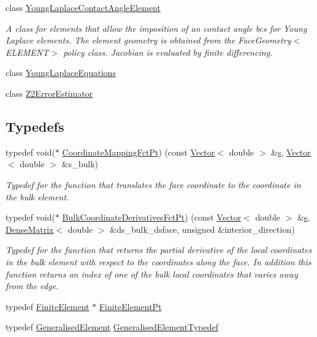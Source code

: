 \begin{DoxyCompactItemize}
class \hyperlink{classoomph_1_1YoungLaplaceContactAngleElement}{Young\+Laplace\+Contact\+Angle\+Element}
\begin{DoxyCompactList}\small\item\em A class for elements that allow the imposition of an contact angle bcs for Young Laplace elements. The element geometry is obtained from the Face\+Geometry$<$\+E\+L\+E\+M\+E\+N\+T$>$ policy class. Jacobian is evaluated by finite differencing. \end{DoxyCompactList}\item 
class \hyperlink{classoomph_1_1YoungLaplaceEquations}{Young\+Laplace\+Equations}
\item 
class \hyperlink{classoomph_1_1Z2ErrorEstimator}{Z2\+Error\+Estimator}
\end{DoxyCompactItemize}
\subsection*{Typedefs}
\begin{DoxyCompactItemize}
\item 
typedef void($\ast$ \hyperlink{namespaceoomph_afa5c7a93cae1917e874b392601be0bde}{Coordinate\+Mapping\+Fct\+Pt}) (const \hyperlink{classoomph_1_1Vector}{Vector}$<$ double $>$ \&\hyperlink{cfortran_8h_ab7123126e4885ef647dd9c6e3807a21c}{s}, \hyperlink{classoomph_1_1Vector}{Vector}$<$ double $>$ \&s\+\_\+bulk)
\begin{DoxyCompactList}\small\item\em Typedef for the function that translates the face coordinate to the coordinate in the bulk element. \end{DoxyCompactList}\item 
typedef void($\ast$ \hyperlink{namespaceoomph_a0a75fbfa1139f00cf88adeee835c8fe5}{Bulk\+Coordinate\+Derivatives\+Fct\+Pt}) (const \hyperlink{classoomph_1_1Vector}{Vector}$<$ double $>$ \&\hyperlink{cfortran_8h_ab7123126e4885ef647dd9c6e3807a21c}{s}, \hyperlink{classoomph_1_1DenseMatrix}{Dense\+Matrix}$<$ double $>$ \&ds\+\_\+bulk\+\_\+dsface, unsigned \&interior\+\_\+direction)
\begin{DoxyCompactList}\small\item\em Typedef for the function that returns the partial derivative of the local coordinates in the bulk element with respect to the coordinates along the face. In addition this function returns an index of one of the bulk local coordinates that varies away from the edge. \end{DoxyCompactList}\item 
typedef \hyperlink{classoomph_1_1FiniteElement}{Finite\+Element} $\ast$ \hyperlink{namespaceoomph_a3a774afab5900fed47e092a013f9efb8}{Finite\+Element\+Pt}
\item 
typedef \hyperlink{classoomph_1_1GeneralisedElement}{Generalised\+Element} \hyperlink{namespaceoomph_a14fee011765f6f5c9d1923650cf4018e}{Generalised\+Element\+Typedef}
\end{DoxyCompactItemize}
